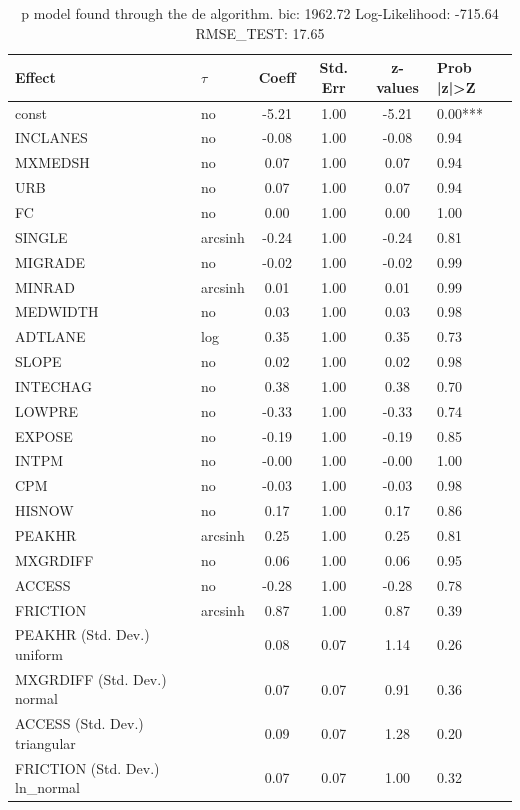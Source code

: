 \begin{table}
	\caption{p model found through the de algorithm. bic: 1962.72 Log-Likelihood: -715.64 RMSE_TEST: 17.65}
	\begin{center}
		\begin{tabular}{|l|l|c|c|c|l|}
			\hline
			Effect & $\tau$ & Coeff & Std. Err & z-values & Prob |z|>Z \\
			\hline
			const & no & -5.21 & 1.00 & -5.21 & 0.00*** \\
			\hline
			INCLANES & no & -0.08 & 1.00 & -0.08 & 0.94 \\
			\hline
			MXMEDSH & no & 0.07 & 1.00 & 0.07 & 0.94 \\
			\hline
			URB & no & 0.07 & 1.00 & 0.07 & 0.94 \\
			\hline
			FC & no & 0.00 & 1.00 & 0.00 & 1.00 \\
			\hline
			SINGLE & arcsinh & -0.24 & 1.00 & -0.24 & 0.81 \\
			\hline
			MIGRADE & no & -0.02 & 1.00 & -0.02 & 0.99 \\
			\hline
			MINRAD & arcsinh & 0.01 & 1.00 & 0.01 & 0.99 \\
			\hline
			MEDWIDTH & no & 0.03 & 1.00 & 0.03 & 0.98 \\
			\hline
			ADTLANE & log & 0.35 & 1.00 & 0.35 & 0.73 \\
			\hline
			SLOPE & no & 0.02 & 1.00 & 0.02 & 0.98 \\
			\hline
			INTECHAG & no & 0.38 & 1.00 & 0.38 & 0.70 \\
			\hline
			LOWPRE & no & -0.33 & 1.00 & -0.33 & 0.74 \\
			\hline
			EXPOSE & no & -0.19 & 1.00 & -0.19 & 0.85 \\
			\hline
			INTPM & no & -0.00 & 1.00 & -0.00 & 1.00 \\
			\hline
			CPM & no & -0.03 & 1.00 & -0.03 & 0.98 \\
			\hline
			HISNOW & no & 0.17 & 1.00 & 0.17 & 0.86 \\
			\hline
			PEAKHR & arcsinh & 0.25 & 1.00 & 0.25 & 0.81 \\
			\hline
			MXGRDIFF & no & 0.06 & 1.00 & 0.06 & 0.95 \\
			\hline
			ACCESS & no & -0.28 & 1.00 & -0.28 & 0.78 \\
			\hline
			FRICTION & arcsinh & 0.87 & 1.00 & 0.87 & 0.39 \\
			\hline
			PEAKHR (Std. Dev.) uniform &  & 0.08 & 0.07 & 1.14 & 0.26 \\
			\hline
			MXGRDIFF (Std. Dev.) normal &  & 0.07 & 0.07 & 0.91 & 0.36 \\
			\hline
			ACCESS (Std. Dev.) triangular &  & 0.09 & 0.07 & 1.28 & 0.20 \\
			\hline
			FRICTION (Std. Dev.) ln_normal &  & 0.07 & 0.07 & 1.00 & 0.32 \\
			\hline
		\end{tabular}
	\end{center}
\end{table}